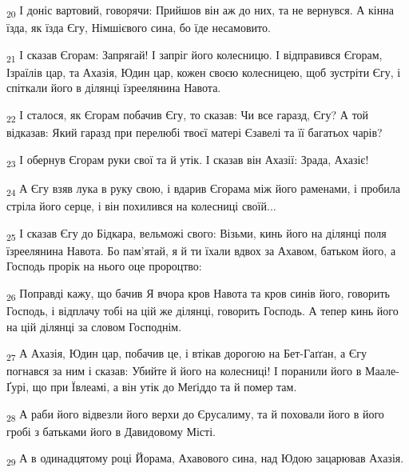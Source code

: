\begin{tcolorbox}
\textsubscript{20} І доніс вартовий, говорячи: Прийшов він аж до них, та не вернувся. А кінна їзда, як їзда Єгу, Німшієвого сина, бо їде несамовито.
\end{tcolorbox}
\begin{tcolorbox}
\textsubscript{21} І сказав Єгорам: Запрягай! І запріг його колесницю. І відправився Єгорам, Ізраїлів цар, та Ахазія, Юдин цар, кожен своєю колесницею, щоб зустріти Єгу, і спіткали його в ділянці їзреелянина Навота.
\end{tcolorbox}
\begin{tcolorbox}
\textsubscript{22} І сталося, як Єгорам побачив Єгу, то сказав: Чи все гаразд, Єгу? А той відказав: Який гаразд при перелюбі твоєї матері Єзавелі та її багатьох чарів?
\end{tcolorbox}
\begin{tcolorbox}
\textsubscript{23} І обернув Єгорам руки свої та й утік. І сказав він Ахазії: Зрада, Ахазіє!
\end{tcolorbox}
\begin{tcolorbox}
\textsubscript{24} А Єгу взяв лука в руку свою, і вдарив Єгорама між його раменами, і пробила стріла його серце, і він похилився на колесниці своїй...
\end{tcolorbox}
\begin{tcolorbox}
\textsubscript{25} І сказав Єгу до Бідкара, вельможі свого: Візьми, кинь його на ділянці поля їзреелянина Навота. Бо пам'ятай, я й ти їхали вдвох за Ахавом, батьком його, а Господь прорік на нього оце пророцтво:
\end{tcolorbox}
\begin{tcolorbox}
\textsubscript{26} Поправді кажу, що бачив Я вчора кров Навота та кров синів його, говорить Господь, і відплачу тобі на цій же ділянці, говорить Господь. А тепер кинь його на цій ділянці за словом Господнім.
\end{tcolorbox}
\begin{tcolorbox}
\textsubscript{27} А Ахазія, Юдин цар, побачив це, і втікав дорогою на Бет-Гаґґан, а Єгу погнався за ним і сказав: Убийте й його на колесниці! І поранили його в Маале-Ґурі, що при Ївлеамі, а він утік до Меґіддо та й помер там.
\end{tcolorbox}
\begin{tcolorbox}
\textsubscript{28} А раби його відвезли його верхи до Єрусалиму, та й поховали його в його гробі з батьками його в Давидовому Місті.
\end{tcolorbox}
\begin{tcolorbox}
\textsubscript{29} А в одинадцятому році Йорама, Ахавового сина, над Юдою зацарював Ахазія.
\end{tcolorbox}
